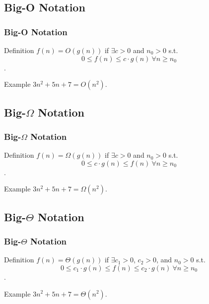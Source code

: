 \documentclass[t]{beamer}
\begin{document}
        \subsection{Big-O Notation}
            \begin{frame}
                \frametitle{Big-O Notation}
                \begin{block}{Definition}
                    $f(n) = O(g(n))$ if $\exists c > 0$ and $n_0 > 0$ s.t. \[0 \leq f(n) \leq c \cdot g(n)\ \forall n \geq n_0\].
                \end{block}

                \begin{block}{Example}
                    $3n^2 + 5n + 7 = O(n^2)$.
                \end{block}
            \end{frame}

        \subsection{Big-$\Omega$ Notation}
            \begin{frame}
                \frametitle{Big-$\Omega$ Notation}
                \begin{block}{Definition}
                    $f(n) = \Omega(g(n))$ if $\exists c > 0$ and $n_0 > 0$ s.t. \[0 \leq c \cdot g(n) \leq f(n)\ \forall n \geq n_0\].
                \end{block}

                \begin{block}{Example}
                    $3n^2 + 5n + 7 = \Omega(n^2)$.
                \end{block}
            \end{frame}

        \subsection{Big-$\Theta$ Notation}
            \begin{frame}
                \frametitle{Big-$\Theta$ Notation}
                \begin{block}{Definition}
                    $f(n) = \Theta(g(n))$ if $\exists c_1 > 0$, $c_2 > 0$, and $n_0 > 0$ s.t. 
                    \[0 \leq c_1 \cdot g(n) \leq f(n) \leq c_2 \cdot g(n)\ \forall n \geq n_0\].
                \end{block}

                \begin{block}{Example}
                    $3n^2 + 5n + 7 = \Theta(n^2)$.
                \end{block}
            \end{frame}
\end{document}
